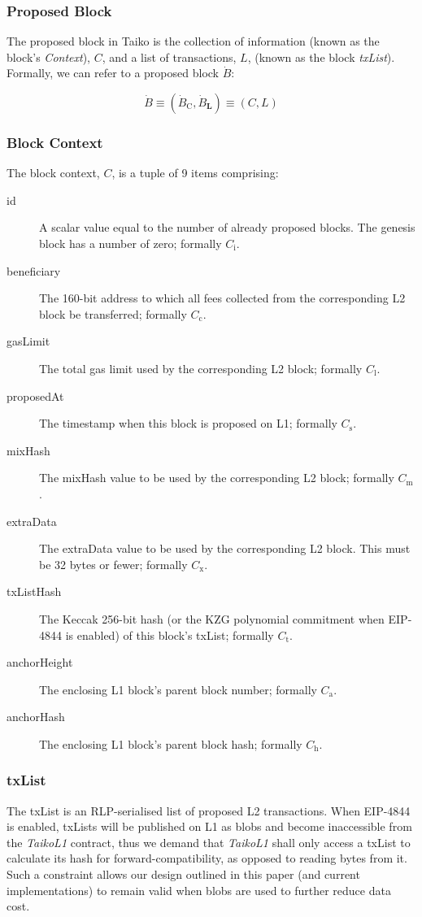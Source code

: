 \documentclass[9pt,oneside]{amsart}
\begin{document}
\begin{multicols}{2}
\subsubsection{Proposed Block} The proposed block in Taiko is the collection of information (known as the block's \textit{Context}), $C$, and a list of transactions, $L$,  (known as the block \textit{txList}). Formally, we can refer to a proposed block $\dot{B}$:

\begin{equation}
\dot{B} \equiv (\dot{B}_{\mathrm{C}}, \dot{B}_{\mathbf{L}}) \equiv (C, L)
\end{equation}

\subsubsection{Block Context} The block context, $C$, is a tuple of 9 items comprising:


\begin{description}
\item[id] A scalar value equal to the number of already proposed blocks. The genesis block has a number of zero; formally $C_{\mathrm{i}}$.
\item[beneficiary] The 160-bit address to which all fees collected from the corresponding L2 block be transferred; formally $C_{\mathrm{c}}$.
\item[gasLimit] The total gas limit used by the corresponding L2 block; formally $C_{\mathrm{l}}$.
\item[proposedAt] The timestamp when this block is proposed on L1; formally $C_{\mathrm{s}}$.
\item[mixHash] The mixHash value to be used by the corresponding L2 block; formally $C_{\mathrm{m}}$.
\item[extraData] The extraData value to be used by the corresponding L2 block. This must be 32 bytes or fewer; formally $C_{\mathrm{x}}$.
\item[txListHash] The Keccak 256-bit hash (or the KZG polynomial commitment when EIP-4844 is enabled) of this block's txList; formally $C_{\mathrm{t}}$. 
\item[anchorHeight] The enclosing L1 block's parent block number; formally $C_{\mathrm{a}}$.
\item[anchorHash] The enclosing L1 block's parent block hash; formally $C_{\mathrm{h}}$.
\end{description}

\subsubsection{txList}\label{sec:txlist}
The txList is an RLP-serialised list of proposed L2 transactions. When EIP-4844 is enabled, txLists will be published on L1 as blobs\cite{eip4844} and become inaccessible from the \textit{TaikoL1} contract, thus we demand that \textit{TaikoL1} shall only access a txList to calculate its hash for forward-compatibility, as opposed to reading bytes from it. Such a constraint allows our design outlined in this paper (and current implementations) to remain valid when blobs are used to further reduce data cost.





\end{multicols}
\end{document}
